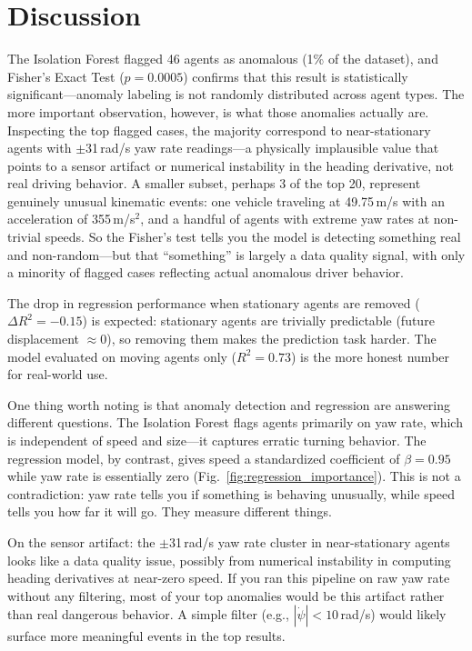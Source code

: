 \documentclass[conference]{IEEEtran}
\begin{document}
\section{Discussion}

The Isolation Forest flagged 46 agents as anomalous (1\% of the dataset), and Fisher's Exact Test ($p = 0.0005$) confirms that this result is statistically significant---anomaly labeling is not randomly distributed across agent types. The more important observation, however, is what those anomalies actually are. Inspecting the top flagged cases, the majority correspond to near-stationary agents with $\pm$31\,rad/s yaw rate readings---a physically implausible value that points to a sensor artifact or numerical instability in the heading derivative, not real driving behavior. A smaller subset, perhaps 3 of the top 20, represent genuinely unusual kinematic events: one vehicle traveling at 49.75\,m/s with an acceleration of 355\,m/s$^2$, and a handful of agents with extreme yaw rates at non-trivial speeds. So the Fisher's test tells you the model is detecting something real and non-random---but that ``something'' is largely a data quality signal, with only a minority of flagged cases reflecting actual anomalous driver behavior.

The drop in regression performance when stationary agents are removed ($\Delta R^2 = -0.15$) is expected: stationary agents are trivially predictable (future displacement $\approx 0$), so removing them makes the prediction task harder. The model evaluated on moving agents only ($R^2 = 0.73$) is the more honest number for real-world use.

One thing worth noting is that anomaly detection and regression are answering different questions. The Isolation Forest flags agents primarily on yaw rate, which is independent of speed and size---it captures erratic turning behavior. The regression model, by contrast, gives speed a standardized coefficient of $\beta = 0.95$ while yaw rate is essentially zero (Fig.~\ref{fig:regression_importance}). This is not a contradiction: yaw rate tells you if something is behaving unusually, while speed tells you how far it will go. They measure different things.

On the sensor artifact: the $\pm$31\,rad/s yaw rate cluster in near-stationary agents looks like a data quality issue, possibly from numerical instability in computing heading derivatives at near-zero speed. If you ran this pipeline on raw yaw rate without any filtering, most of your top anomalies would be this artifact rather than real dangerous behavior. A simple filter (e.g., $|\dot{\psi}| < 10$\,rad/s) would likely surface more meaningful events in the top results.
\end{document}
